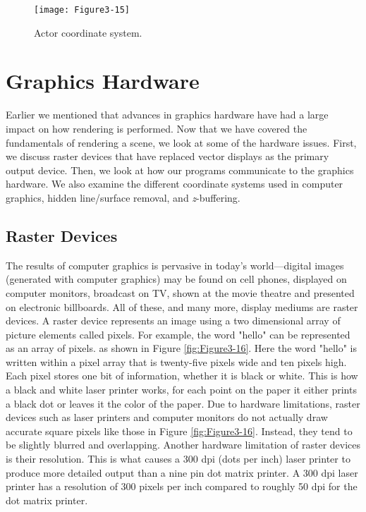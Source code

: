 \begin{figure}[!htb]
  \centering
  \texttt{[image: Figure3-15]}\\
  \caption{Actor coordinate system.}\label{fig:Figure3-15}
\end{figure}


\section{Graphics Hardware}
\label{sec:graphics_hardware}

Earlier we mentioned that advances in graphics hardware have had a large impact on how rendering is performed. Now that we have covered the fundamentals of rendering a scene, we look at some of the hardware issues. First, we discuss raster devices that have replaced vector displays as the primary output device. Then, we look at how our programs communicate to the graphics hardware. We also examine the different coordinate systems used in computer graphics, hidden line/surface removal, and \emph{z}-buffering.

\subsection{Raster Devices}
\label{subsec:rasterization}

The results of computer graphics is pervasive in today's world---digital images (generated with computer graphics) may be found on cell phones, displayed on computer monitors, broadcast on TV, shown at the movie theatre and presented on electronic billboards. All of these, and many more, display mediums are raster devices. A raster device represents an image using a two dimensional array of picture elements called pixels. For example, the word "hello" can be represented as an array of pixels. as shown in Figure \ref{fig:Figure3-16}. Here the word "hello" is written within a pixel array that is twenty-five pixels wide and ten pixels high. Each pixel stores one bit of information, whether it is black or white. This is how a black and white laser printer works, for each point on the paper it either prints a black dot or leaves it the color of the paper. Due to hardware limitations, raster devices such as laser printers and computer monitors do not actually draw accurate square pixels like those in Figure \ref{fig:Figure3-16}. Instead, they tend to be slightly blurred and overlapping. Another hardware limitation of raster devices is their resolution. This is what causes a 300 dpi (dots per inch) laser printer to produce more detailed output than a nine pin dot matrix printer. A 300 dpi laser printer has a resolution of 300 pixels per inch compared to roughly 50 dpi for the dot matrix printer.

